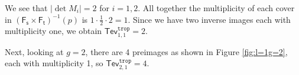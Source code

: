 \documentclass[11pt,reqno]{amsart}
\theoremstyle{definition}
\newcommand\trop{{\mathtt{trop}}}
\newcommand{\Ft}{\mathsf{F_t}}
\newcommand{\Fs}{\mathsf{F_s}}
\newcommand{\Tev}{{\mathsf{Tev}}}
\begin{document}
We see that $|\det M_i |=2$ for $i = 1,2$.
All together the multiplicity of each cover in $(\Fs\times\Ft)^{-1}(p)$ is $1\cdot \frac{1}{2}\cdot 2=1$. Since we have two inverse images each with multiplicity one,  we obtain $\Tev^\trop_{1,1} = 2$.

Next, looking at $g=2$, there are 4 preimages as shown in Figure \ref{fig:l=1g=2}, each with multiplicity 1, so $\Tev_{2,1}^\trop=4$.
\begin{figure}[tb]
    \centering



\begin{tikzpicture}[x=0.75pt,y=0.75pt,yscale=-1,xscale=1]


\end{tikzpicture}
\end{figure}
\end{document}
